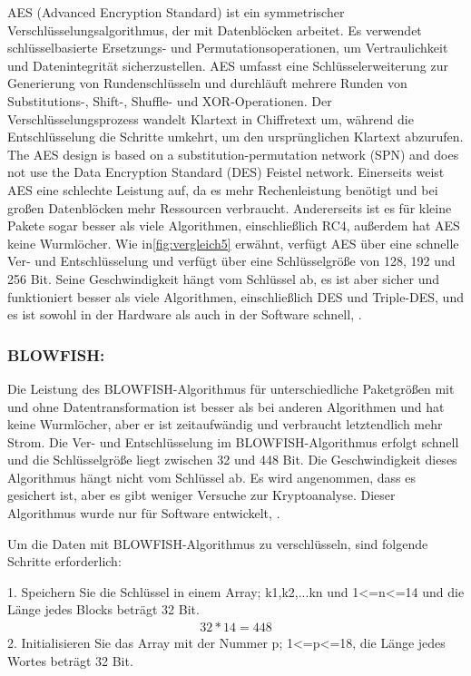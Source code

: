 AES (Advanced Encryption Standard) ist ein symmetrischer Verschlüsselungsalgorithmus, der mit Datenblöcken arbeitet. Es verwendet schlüsselbasierte Ersetzungs- und Permutationsoperationen, um Vertraulichkeit und Datenintegrität sicherzustellen. AES umfasst eine Schlüsselerweiterung zur Generierung von Rundenschlüsseln und durchläuft mehrere Runden von Substitutions-, Shift-, Shuffle- und XOR-Operationen. Der Verschlüsselungsprozess wandelt Klartext in Chiffretext um, während die Entschlüsselung die Schritte umkehrt, um den ursprünglichen Klartext abzurufen.\cite{abdullah2017advanced}
The AES design is based on a substitution-permutation network 
(SPN) and does not use the Data Encryption Standard (DES) Feistel network\cite{raghav2016securing}.
Einerseits weist AES eine schlechte Leistung auf, da es mehr Rechenleistung benötigt und bei großen Datenblöcken mehr Ressourcen verbraucht. Andererseits ist es für kleine Pakete sogar besser als viele Algorithmen, einschließlich RC4, außerdem hat AES keine Wurmlöcher.\cite{abdullah2017advanced}
Wie in\ref{fig:vergleich5} erwähnt, verfügt AES über eine schnelle Ver- und Entschlüsselung und verfügt über eine Schlüsselgröße von 128, 192 und 256 Bit. Seine Geschwindigkeit hängt vom Schlüssel ab, es ist aber sicher und funktioniert besser als viele Algorithmen, einschließlich DES und Triple-DES, und es ist sowohl in der Hardware als auch in der Software schnell\cite{devi2015review}, \cite{abdullah2017advanced}.


\subsubsection{BLOWFISH:}

Die Leistung des BLOWFISH-Algorithmus für unterschiedliche Paketgrößen mit und ohne Datentransformation ist besser als bei anderen Algorithmen und hat keine Wurmlöcher, aber er ist zeitaufwändig und verbraucht letztendlich mehr Strom\cite{thambiraja2012survey}.
Die Ver- und Entschlüsselung im BLOWFISH-Algorithmus erfolgt schnell und die Schlüsselgröße liegt zwischen 32 und 448 Bit. Die Geschwindigkeit dieses Algorithmus hängt nicht vom Schlüssel ab. Es wird angenommen, dass es gesichert ist, aber es gibt weniger Versuche zur Kryptoanalyse. Dieser Algorithmus wurde nur für Software entwickelt\cite{devi2015review}, \cite{thambiraja2012survey}.

Um die Daten mit BLOWFISH-Algorithmus zu verschlüsseln, sind folgende Schritte erforderlich:

1. Speichern Sie die Schlüssel in einem Array; k1,k2,...kn und 1<=n<=14
und die Länge jedes Blocks beträgt 32 Bit.\begin{align*}
32*14=448 \end{align*}
2. Initialisieren Sie das Array mit der Nummer p; 1<=p<=18, die Länge jedes Wortes beträgt 32 Bit.

